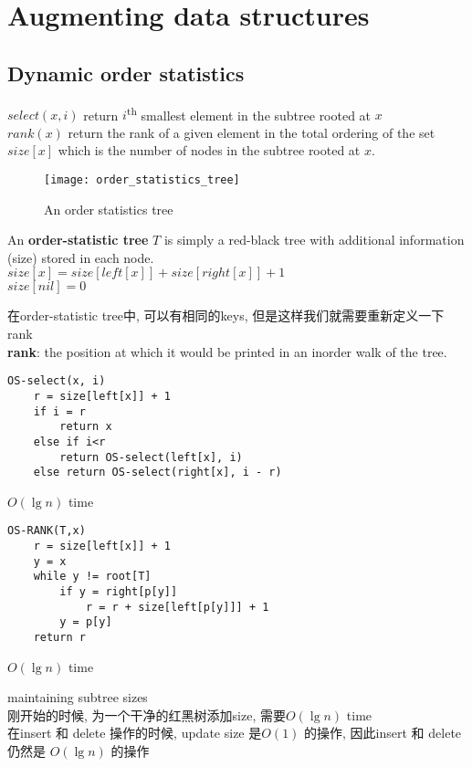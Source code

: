 \documentclass{article}
\begin{document}
\section{Augmenting data structures}
\subsection{Dynamic order statistics}
\noindent $select(x, i)$ return $i$\textsuperscript{th} smallest element in the subtree rooted at $x$\\
$rank(x)$ return the rank of a given element in the total ordering of the set\\
$size[x]$ which is the number of nodes in the subtree rooted at $x$.
\begin{figure}[htbp]
  \centering
  \texttt{[image: order\_statistics\_tree]}\\
  \caption{An order statistics tree}\label{fig.order_statistics_tree}
\end{figure}

\bigskip
An \textbf{order-statistic tree} $T$ is simply a red-black tree with additional information (size) stored in each node.\\
$size[x] = size[left[x]] + size[right[x]] + 1$\\
$size[nil] = 0$

\bigskip
在order-statistic tree中, 可以有相同的keys, 但是这样我们就需要重新定义一下rank\\
\textbf{rank}: the position at which it would be printed in an inorder walk of the tree.

\begin{verbatim}
OS-select(x, i)
    r = size[left[x]] + 1
    if i = r
        return x
    else if i<r
        return OS-select(left[x], i)
    else return OS-select(right[x], i - r)
\end{verbatim}

$O(\lg n)$ time

\begin{verbatim}
OS-RANK(T,x)
    r = size[left[x]] + 1
    y = x
    while y != root[T]
        if y = right[p[y]]
            r = r + size[left[p[y]]] + 1
        y = p[y]
    return r
\end{verbatim}

$O(\lg n)$ time

maintaining subtree sizes\\
刚开始的时候, 为一个干净的红黑树添加size, 需要$O(\lg n)$ time\\
在insert 和 delete 操作的时候, update size 是$O(1)$ 的操作, 因此insert 和 delete 仍然是 $O(\lg n)$ 的操作
\end{document}
